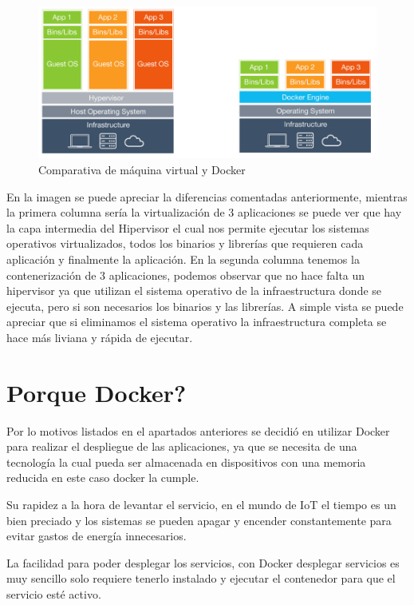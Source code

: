 \begin{figure}[htb]
\begin{center}
\includegraphics[width=1\textwidth]{./setup/VrvsDocker}
\caption{Comparativa de máquina virtual y Docker}
\label{F:VrvsDocker}
\end{center}
\end{figure}

En la imagen se puede apreciar la diferencias comentadas anteriormente, mientras la primera columna sería la virtualización de 3 aplicaciones se puede ver que hay la capa intermedia del Hipervisor el cual nos permite ejecutar los sistemas operativos virtualizados, todos los binarios y librerías que requieren cada aplicación y finalmente la aplicación. 
En la segunda columna tenemos la contenerización de 3 aplicaciones, podemos observar que no hace falta un hipervisor ya que utilizan el sistema operativo de la infraestructura donde se ejecuta, pero si son necesarios los binarios y las librerías.
A simple vista se puede apreciar que si eliminamos el sistema operativo la infraestructura completa se hace más liviana y rápida de ejecutar.

\section{Porque Docker?}

Por lo motivos listados en el apartados anteriores se decidió en utilizar Docker para realizar el despliegue de las aplicaciones, ya que se necesita de una tecnología la cual pueda ser almacenada en dispositivos con una memoria reducida en este caso docker la cumple. 

Su rapidez a la hora de levantar el servicio, en el mundo de IoT el tiempo es un bien preciado y los sistemas se pueden apagar y encender constantemente para evitar gastos de energía innecesarios.

La facilidad para poder desplegar los servicios, con Docker desplegar servicios es muy sencillo solo requiere tenerlo instalado y ejecutar el contenedor para que el servicio esté activo.

